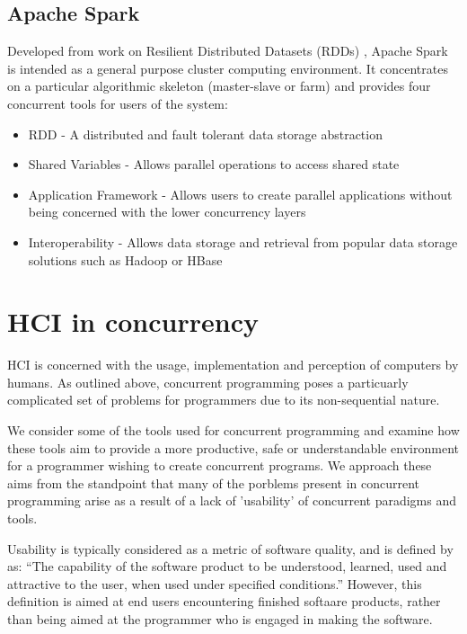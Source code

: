 \documentclass{sig-alternate}
\begin{document}
\subsection{Apache Spark}
Developed from work on Resilient Distributed Datasets (RDDs)  \cite{zaharia14:_archit_fast_gener_data_proces_large_clust},  Apache Spark is intended as a general purpose cluster computing environment. It concentrates on a particular algorithmic skeleton (master-slave or farm) and provides four concurrent tools for users of the system:

\begin{itemize}
\item RDD - A distributed and fault tolerant data storage abstraction
\item Shared Variables - Allows parallel operations to access shared state
\item Application Framework - Allows users to create parallel applications without being concerned with the lower concurrency layers
\item Interoperability - Allows data storage and retrieval from popular data storage solutions such as Hadoop or HBase
\end{itemize}

\section{HCI in concurrency}
HCI is concerned with the usage, implementation and perception of computers by humans. As outlined above, concurrent programming poses a particuarly complicated set of problems for programmers due to its non-sequential nature. 

We consider some of the tools used for concurrent programming and examine how these tools aim to provide a more productive, safe or understandable environment for a programmer wishing to create concurrent programs. We approach these aims from the standpoint that many of the porblems present in concurrent programming arise as a result of a lack of 'usability' of concurrent paradigms and tools.

Usability is typically considered as a metric of software quality, and is defined by \cite{9126} as: ``The capability of the software product to be understood, learned, used and attractive to the user, when used under specified conditions.'' However, this definition is aimed at end users encountering finished softaare products, rather than being aimed at the programmer who is engaged in making the software.
\end{document}
